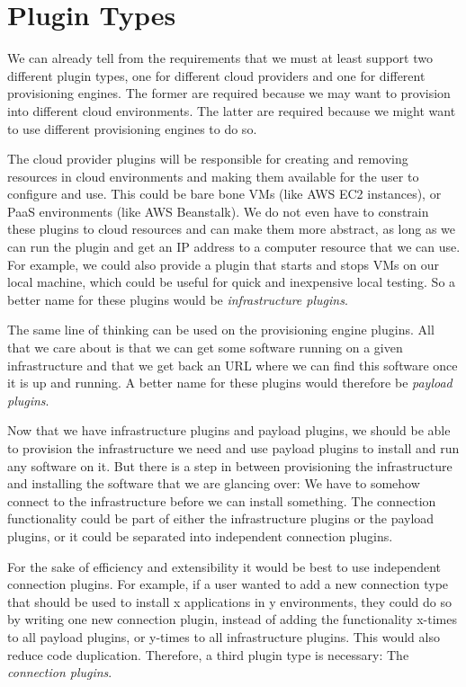 \section{Plugin Types}
\label{design:plugins}

We can already tell from the requirements that we must at least support two different plugin types, one for different cloud providers and one for different provisioning engines.
The former are required because we may want to provision into different cloud environments.
The latter are required because we might want to use different provisioning engines to do so.

The cloud provider plugins will be responsible for creating and removing resources in cloud environments and making them available for the user to configure and use.
This could be bare bone VMs (like AWS EC2 instances), or PaaS environments (like AWS Beanstalk).
We do not even have to constrain these plugins to cloud resources and can make them more abstract, as long as we can run the plugin and get an IP address to a computer resource that we can use.
For example, we could also provide a plugin that starts and stops VMs on our local machine, which could be useful for quick and inexpensive local testing.
So a better name for these plugins would be \textit{infrastructure plugins}.

The same line of thinking can be used on the provisioning engine plugins.
All that we care about is that we can get some software running on a given infrastructure and that we get back an URL where we can find this software once it is up and running.
A better name for these plugins would therefore be \textit{payload plugins}.

Now that we have infrastructure plugins and payload plugins, we should be able to provision the infrastructure we need and use payload plugins to install and run any software on it.
But there is a step in between provisioning the infrastructure and installing the software that we are glancing over: We have to somehow connect to the infrastructure before we can install something.
The connection functionality could be part of either the infrastructure plugins or the payload plugins, or it could be separated into independent connection plugins.

For the sake of efficiency and extensibility it would be best to use independent connection plugins.
For example, if a user wanted to add a new connection type that should be used to install x applications in y environments, they could do so by writing one new connection plugin, instead of adding the functionality x-times to all payload plugins, or y-times to all infrastructure plugins.
This would also reduce code duplication.
Therefore, a third plugin type is necessary: The \textit{connection plugins}.

